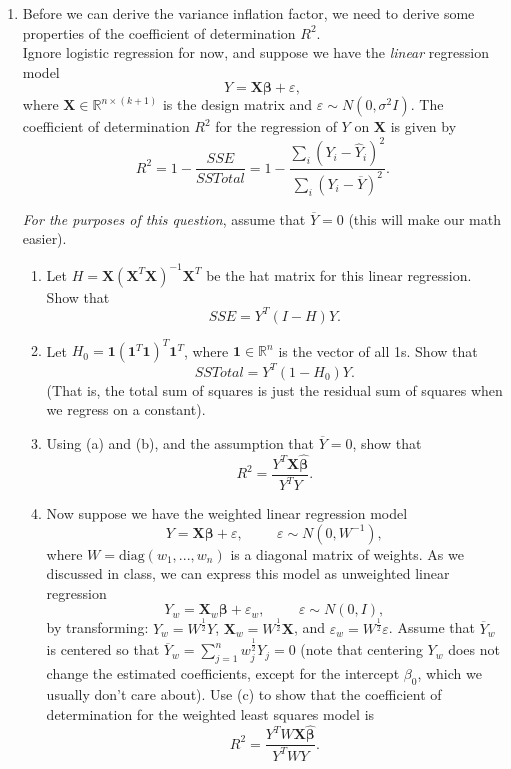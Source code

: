 \documentclass[11pt]{article}
\begin{document}
\begin{enumerate}
\item Before we can derive the variance inflation factor, we need to derive some properties of the coefficient of determination $R^2$.\\

Ignore logistic regression for now, and suppose we have the \textit{linear} regression model
$$Y = \bm{X} \bm{\beta} + \varepsilon,$$
where $\bm{X} \in \mathbb{R}^{n \times (k+1)}$ is the design matrix and $\varepsilon \sim N(0, \sigma^2 I).$ The coefficient of determination $R^2$ for the regression of $Y$ on $\bm{X}$ is given by
$$R^2 = 1 - \dfrac{SSE}{SSTotal} = 1 - \dfrac{\sum_i (Y_i - \widehat{Y}_i)^2}{\sum_i (Y_i - \overline{Y})^2}.$$

\textit{For the purposes of this question}, assume that $\overline{Y} = 0$ (this will make our math easier).

\begin{enumerate}
\item Let $H = \bm{X}(\bm{X}^T \bm{X})^{-1} \bm{X}^T$ be the hat matrix for this linear regression. Show that 
$$SSE = Y^T(I - H)Y.$$

\item Let $H_0 = \bm{1} (\bm{1}^T \bm{1})^T \bm{1}^T$, where $\bm{1} \in \mathbb{R}^n$ is the vector of all 1s. Show that
$$SSTotal = Y^T(1 - H_0)Y.$$
(That is, the total sum of squares is just the residual sum of squares when we regress on a constant).

\item Using (a) and (b), and the assumption that $\overline{Y} = 0$, show that 
$$R^2 = \dfrac{Y^T \bm{X} \widehat{\bm{\beta}}}{Y^T Y}.$$

\item Now suppose we have the weighted linear regression model
$$Y = \bm{X} \bm{\beta} + \varepsilon, \hspace{1cm} \varepsilon \sim N(0, W^{-1}),$$
where $W = \text{diag}(w_1,...,w_n)$ is a diagonal matrix of weights. As we discussed in class, we can express this model as unweighted linear regression 
$$Y_w = \bm{X}_w \bm{\beta} + \varepsilon_w, \hspace{1cm} \varepsilon \sim N(0, I),$$
by transforming: $Y_w = W^{\frac{1}{2}} Y$, $\bm{X}_w = W^{\frac{1}{2}} \bm{X}$, and $\varepsilon_w = W^{\frac{1}{2}} \varepsilon$. Assume that $\overline{Y}_w$ is centered so that $\overline{Y}_w = \sum_{j=1}^n w_j^{\frac{1}{2}} Y_j = 0$ (note that centering $Y_w$ does not change the estimated coefficients, except for the intercept $\beta_0$, which we usually don't care about). Use (c) to show that the coefficient of determination for the weighted least squares model is
$$R^2 = \dfrac{Y^T W \bm{X} \widehat{\bm{\beta}}}{Y^T W Y}.$$


\end{enumerate}
\end{enumerate}
\end{document}
